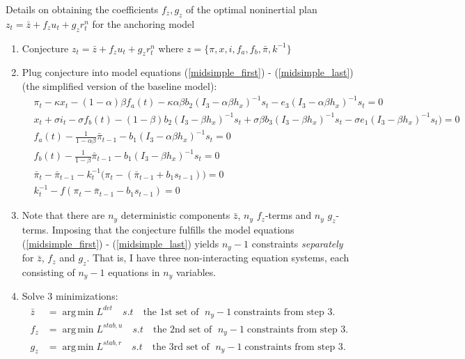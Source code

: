 \documentclass[11pt]{article}
\renewcommand{\[}{\begin{equation}}
\renewcommand{\]}{\end{equation}}
\DeclareMathOperator{\argmin}{arg\,min}
\begin{document}
\newpage
\noindent Details on obtaining the coefficients $f_z, g_z$ of the optimal noninertial plan $z_t = \bar{z} + f_z u_t + g_z r_t^n$ for the anchoring model 
\begin{enumerate}
\item Conjecture $z_t = \bar{z} + f_z u_t + g_z r_t^n$ where $z = \{\pi,x,i, f_a, f_b, \bar{\pi}, k^{-1}\}$
\item Plug conjecture into model equations (\ref{midsimple_first}) - (\ref{midsimple_last}) (the simplified version of the baseline model):
 \begin{align}
 &  \pi_t - \kappa x_t -(1-\alpha)\beta f_a(t) -\kappa\alpha\beta b_2 (I_3 - \alpha\beta h_x)^{-1}s_t - e_3(I_3 - \alpha\beta h_x)^{-1}s_t = 0 \label{midsimple_first}\\
 & x_t + \sigma i_t -\sigma f_b(t)  -  (1-\beta)b_2 (I_3 - \beta h_x)^{-1}s_t + \sigma\beta b_3 (I_3 - \beta h_x)^{-1}s_t -\sigma e_1(I_3 - \beta h_x)^{-1}s_t  \big)=0 \\
 &  f_a(t) - \frac{1}{1-\alpha\beta}\bar{\pi}_{t-1}  - b_1(I_3 - \alpha\beta h_x)^{-1}s_t  =0\\
 &  f_b(t) - \frac{1}{1-\beta}\bar{\pi}_{t-1}  - b_1(I_3 - \beta h_x)^{-1}s_t =0  \\
  &  \bar{\pi}_{t} - \bar{\pi}_{t-1} - k_t^{-1}\big(\pi_{t} -(\bar{\pi}_{t-1}+b_1 s_{t-1}) \big)  =0 \\
  &   k_t^{-1} - f(\pi_t - \bar{\pi}_{t-1}-b_1 s_{t-1})  =0 \label{midsimple_last}
\end{align}
\item Note that there are $n_y$ deterministic components $\bar{z}$, $n_y$ $f_z$-terms and $n_y$ $g_z$-terms. Imposing that the conjecture fulfills the model equations (\ref{midsimple_first}) - (\ref{midsimple_last}) yields $n_y -1$ constraints \emph{separately} for $\bar{z}$, $f_z$ and $g_z$. That is, I have three non-interacting equation systems, each consisting of $n_y -1$ equations in $n_y$ variables.
\item Solve 3 minimizations:
\begin{align}
\bar{z} & = \argmin L^{det} \quad s.t \quad \text{the 1st set of } \; n_y -1 \; \text{constraints from step 3}. \\
f_z & = \argmin L^{stab,u} \quad s.t \quad \text{the 2nd set of } \; n_y -1 \; \text{constraints from step 3}. \\
g_z & = \argmin L^{stab,r} \quad s.t \quad \text{the 3rd set of } \; n_y -1 \; \text{constraints from step 3}.
\end{align}

\end{enumerate}
\end{document}
